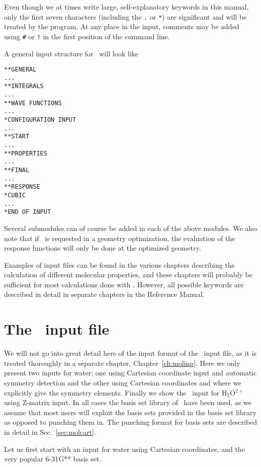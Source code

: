 Even though we at times write large, self-explanatory keywords in this
manual, only the first seven characters (including the \verb|.| or
\verb|*|) are significant and will be
treated by the program. At any 
place in the input, comments may be added using
\verb|#| or \verb|!| 
in the first position of the command line.

A general input structure for \siraba\ will look like

\begin{verbatim}
**GENERAL
...
**INTEGRALS
...
**WAVE FUNCTIONS
...
*CONFIGURATION INPUT
...
**START
...
**PROPERTIES
...
**FINAL
...
**RESPONSE
*CUBIC
...
*END OF INPUT
\end{verbatim}

Several submodules can of course be added in each of the above
modules. We also note that if \resp\ is requested in a geometry
optimization, the evaluation of the response functions will only be
done at the optimized geometry.

Examples of input files can be found in the various chapters
describing the calculation of different molecular properties, and
these chapters will probably be sufficient for most calculations done
with \siraba . However, all possible keywords are described in detail
in separate chapters in the Reference Manual.

\section{The \mol\ input file}

We will not go into great detail here of the input format of the \mol\ input
file, as it is treated thoroughly in a separate chapter,
Chapter~\ref{ch:molinp}. Here we only present two inputs for
water; one 
using Cartesian coordinate input and
automatic symmetry detection and 
the other using Cartesian coordinates and where we explicitly give the
symmetry elements. Finally we show the \mol\ input for H$_{2}$O$^{2+}$
using Z-matrix input. In  
all cases the basis set library of \siraba\ have been used, as we
assume that most users will exploit the basis sets provided in the basis
set library as opposed to punching them in. The punching
format for basis sets are described in detail in Sec.~\ref{sec:molcart}.

Let us first start with an input for water using Cartesian coordinates,
and the very popular 6-31G** basis set.

